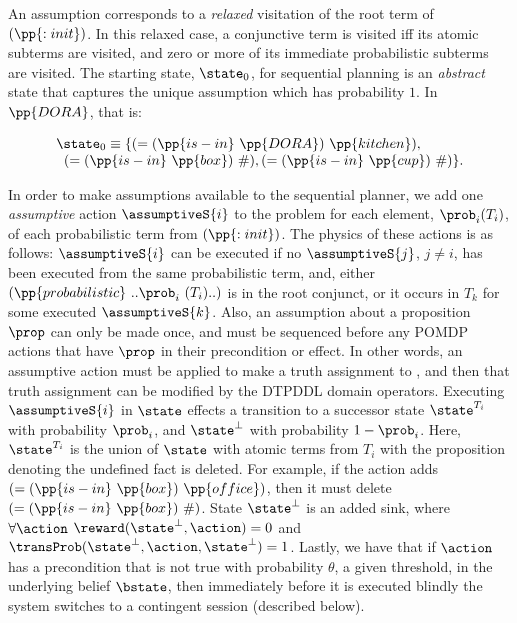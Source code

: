 \noindent An assumption corresponds to a {\em
relaxed} visitation of the root term of $(\pp{:init})$. In this
relaxed case, a conjunctive term is visited iff its atomic subterms
are visited, and zero or more of its immediate probabilistic subterms
are visited. The starting state, $\state_0$, for sequential planning
is an {\em abstract} state that captures the unique assumption which
has probability $1$. In $\pp{DORA}$, that is:

\[
\begin{array}{l}
\state_0 \equiv \{(=(\pp{is-in}~\pp{DORA})~\pp{kitchen}),\\
\;\;(=(\pp{is-in}~\pp{box})~\#), (=(\pp{is-in}~\pp{cup})~\#)\}.
\end{array}
\]

In order to make assumptions available to the sequential planner, we
add one {\em assumptive} action $\assumptiveS{i}$ to the problem for
each element, $\prob_i (T_i)$, of each probabilistic term from
$(\pp{:init})$. The physics of these actions is as
follows: $\assumptiveS{i}$ can be executed if no $\assumptiveS{j}$,
$j \neq i$, has been executed from the same probabilistic term, and,
either $(\pp{probabilistic}~..\prob_i~(T_i)..)$ is in the root
conjunct, or it occurs in $T_k$ for some executed
$\assumptiveS{k}$. Also, an assumption about a proposition
$\prop$ can only be made once, and must be sequenced before any POMDP
actions that have $\prop$ in their precondition or effect.
In other words, an assumptive action
must be applied to make a truth assignment to \prop, and then that
truth assignment can be modified by the DTPDDL domain operators.
Executing $\assumptiveS{i}$ in $\state$ effects a transition to a
successor state $\state^{T_i}$ with probability $\prob_i$, and
$\state^\bot$ with probability $1 - \prob_i$. Here, $\state^{T_i}$ is
the union of $\state$ with atomic terms from $T_i$ with the
proposition denoting the undefined fact is deleted. For example, if
the action adds $(=(\pp{is-in}~\pp{box})~\pp{office})$, then it must
delete $(=(\pp{is-in}~\pp{box})~\#)$. State $\state^\bot$ is an added
sink, where $\forall\action$ $\reward(\state^\bot, \action) = 0$ and
$\transProb(\state^\bot, \action, \state^\bot) = 1$.
Lastly, we have that if $\action$ has a precondition that is not true
with probability $\theta$, a given threshold, in the underlying belief
$\bstate$, then immediately before it is executed blindly the system
switches to a contingent session (described below).


